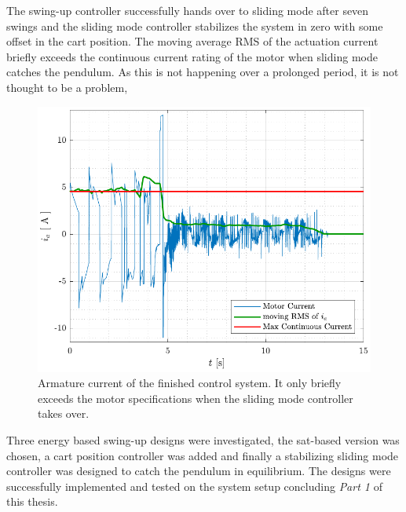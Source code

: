 The swing-up controller successfully hands over to sliding mode after seven swings and the sliding mode controller stabilizes the system in zero with some offset in the cart position.
The moving average RMS of the actuation current briefly exceeds the continuous current rating of the motor when sliding mode catches the pendulum. As this is not happening over a prolonged period, it is not thought to be a problem,
\begin{figure}[H]
  \includegraphics[width=.42\textwidth]{figures/ia_swingNslide}
  \caption{Armature current of the finished control system. It only briefly exceeds the motor specifications when the sliding mode controller takes over.}
  \label{fig:ia_swingNslide}
\end{figure}
%
Three energy based swing-up designs were investigated, the sat-based version was chosen, a cart position controller was added and finally a stabilizing sliding mode controller was designed to catch the pendulum in equilibrium. The designs were successfully implemented and tested on the system setup concluding \textit{Part 1} of this thesis.
